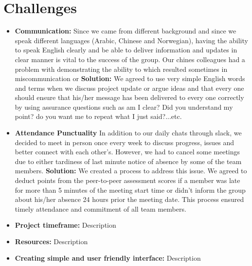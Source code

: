\documentclass{article}
\begin{document}
\section{Challenges}
\begin{itemize}
\item \textbf{Communication:} Since we came from different background and since we speak different languages (Arabic, Chinese and Norwegian), having the ability to speak English clearly and be able to deliver information and updates in clear manner is vital to the success of the group. Our chines colleagues had a problem with demonstrating the ability to which resulted sometimes in miscommunication or \textbf{Solution:} We agreed to use very simple English words and terms when we discuss project update or argue ideas and that every one should ensure that his/her message has been delivered to every one correctly by using assurance questions such as am I clear? Did you understand my point? do you want me to repeat what I just said?...etc.

\item \textbf{Attendance Punctuality} In addition to our daily chats through slack, we decided to meet in person once every week to discuss progress, issues and better connect with each other’s. However, we had to cancel some meetings due to either tardiness of last minute notice of absence by some of the team members.
\textbf{Solution:} We created a process to address this issue. We agreed to deduct points from the peer-to-peer assessment scores if a member was late for more than 5 minutes of the meeting start time or didn’t inform the group about his/her absence 24 hours prior the meeting date.
This process ensured timely attendance and commitment of all team members.
\item \textbf{Project timeframe:}
Description

\item \textbf{Resources:}
Description
\item \textbf{Creating simple and user friendly interface:}
Description
\end{itemize}
\end{document}
